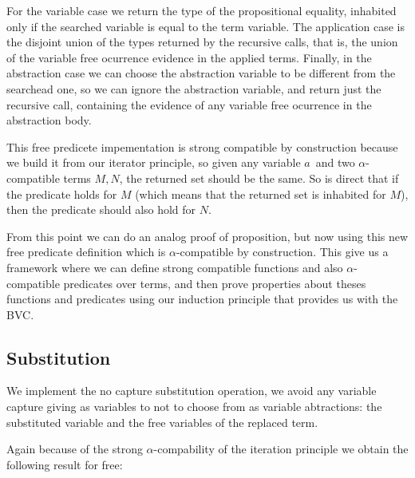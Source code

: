 \documentclass{article}
\newcommand{\alp}{\ensuremath{\alpha}}
\begin{document}
 \hspace{5px}

For the variable case we return the type of the propositional equality, inhabited only if the searched variable is equal to the term variable. The application case is the disjoint union of the types returned by the recursive calls, that is, the union of the variable free ocurrence evidence in the applied terms. Finally, in the abstraction case we can choose the abstraction variable to be different from the searchead one, so we can ignore the abstraction variable, and return just the recursive call, containing the evidence of any variable free ocurrence in the abstraction body. 

This free predicete impementation is strong compatible by construction because we build it from our iterator principle, so given any variable $a$\ and two \alp-compatible terms $M,N$, the returned set should be the same. So is direct that if the predicate holds for $M$ (which means that the returned set is inhabited for $M$), then the predicate should also hold for $N$. 

From this point we can  do an analog proof of  proposition, but now using this new free predicate definition which is \alp-compatible by construction. This give us a framework where we can define strong compatible functions and also \alp-compatible predicates over terms, and then prove properties about theses functions and predicates using our induction principle that provides us with the BVC.

\subsection{Substitution}
\label{subst}

We implement the no capture substitution operation, we avoid any variable capture giving as variables to not to choose from as variable abtractions: the substituted variable and the free variables of the replaced term.

 \hspace{5px}

Again because of the strong \alp-compability of the iteration principle we obtain the following result for free:

 \hspace{5px}
\end{document}
